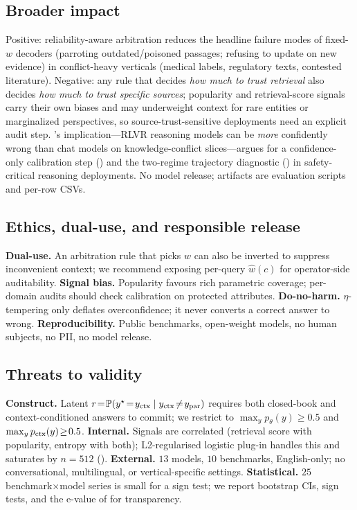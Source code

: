 \subsection{Broader impact}
\label{app:broader-impact}

Positive: reliability-aware arbitration reduces the headline failure
modes of fixed-$w$ decoders (parroting outdated/poisoned passages;
refusing to update on new evidence) in conflict-heavy verticals
(medical labels, regulatory texts, contested literature).
Negative: any rule that decides \emph{how much to trust retrieval}
also decides \emph{how much to trust specific sources}; popularity
and retrieval-score signals carry their own biases and may
underweight context for rare entities or marginalized perspectives,
so source-trust-sensitive deployments need an explicit audit step.
's implication---RLVR reasoning models can be
\emph{more} confidently wrong than chat models on knowledge-conflict
slices---argues for a confidence-only calibration step
() and the two-regime trajectory diagnostic
() in safety-critical reasoning deployments.
No model release; artifacts are evaluation scripts and per-row CSVs.


\subsection{Ethics, dual-use, and responsible release}
\label{app:ethics-dual-use}

\textbf{Dual-use.}  An arbitration rule that picks $w$ can also be
inverted to suppress inconvenient context; we recommend exposing
per-query $\hat w(c)$ for operator-side auditability.
\textbf{Signal bias.}  Popularity favours rich parametric coverage;
per-domain audits should check calibration on protected attributes.
\textbf{Do-no-harm.}  $\eta$-tempering only deflates overconfidence;
it never converts a correct answer to wrong.
\textbf{Reproducibility.}  Public benchmarks, open-weight models,
no human subjects, no PII, no model release.


\subsection{Threats to validity}
\label{app:threats}

\textbf{Construct.}  Latent $r\!=\!\mathbb{P}(y^\star\!=\!y_{\mathrm{ctx}}\mid y_{\mathrm{ctx}}\!\neq\!y_{\mathrm{par}})$
requires both closed-book and context-conditioned answers to commit;
we restrict to $\max_y p_\theta(y)\!\ge\!0.5$ and $\max_y p_{\mathrm{ctx}}(y)\!\ge\!0.5$.
\textbf{Internal.}  Signals are correlated (retrieval score with
popularity, entropy with both); L2-regularised logistic plug-in
handles this and saturates by $n\!=\!512$ ().
\textbf{External.}  $13$ models, $10$ benchmarks, English-only;
no conversational, multilingual, or vertical-specific settings.
\textbf{Statistical.}  $25$ benchmark$\times$model series is small
for a sign test; we report bootstrap CIs, sign tests, and the
e-value of \citet{shafer2021testing} for transparency.




